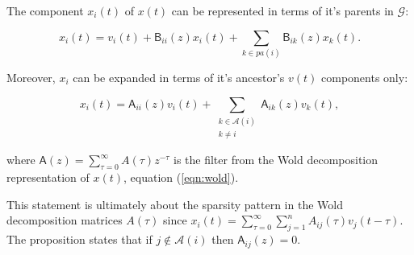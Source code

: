 \documentclass[12pt]{article}
\def\gcg{\mathcal{G}}  %
\def\B{\mathsf{B}}  %
\def\wtB{\widetilde{\B}}  %
\def\A{\mathsf{A}}  %
\newcommand{\pa}[1]{pa(#1)}  %
\newcommand{\anc}[1]{\mathcal{A}(#1)}  %
\newcommand{\ancn}[2]{\mathcal{A}_{#1}(#2)}  %
\newcommand{\gpn}[2]{gp_{#1}(#2)}  %
\begin{document}

\begin{proposition}
  \label{prop:parent_expanding}
  The component $x_i(t)$ of $x(t)$ can be represented in terms of it's
  parents in $\gcg$:

  \begin{equation}
    \label{eqn:parent_expansion}
    x_i(t) = v_i(t) + \B_{ii}(z)x_i(t) + \sum_{k \in \pa{i}}\B_{ik}(z)x_k(t).
  \end{equation}

  Moreover, $x_i$ can be expanded in terms of it's ancestor's $v(t)$
  components only:

  \begin{equation}
    \label{eqn:ancestor_expansion}
    x_i(t) = \A_{ii}(z)v_i(t) + \sum_{\substack{k \in \anc{i} \\ k \ne i}}\A_{ik}(z)v_k(t),
  \end{equation}

  where $\A(z) = \sum_{\tau = 0}^\infty A(\tau)z^{-\tau}$ is the filter from
  the Wold decomposition representation of $x(t)$, equation
  (\ref{eqn:wold}).
\end{proposition}

This statement is ultimately about the sparsity pattern in the Wold
decomposition matrices $A(\tau)$ since
$x_i(t) = \sum_{\tau = 0}^\infty \sum_{j = 1}^n A_{ij}(\tau)v_j(t -
\tau)$.  The proposition states that if $j \not \in \anc{i}$ then
$\A_{ij}(z) = 0$.  




\end{document}
